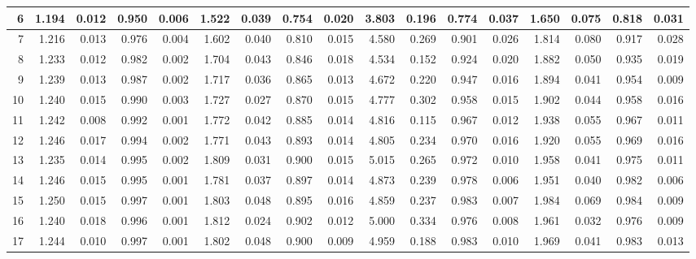 \documentclass[
]{article}
\begin{document}
\begin{table}[H]
{\begin{tabular}[t]{r|r|r|r|r|r|r|r|r|r|r|r|r|r|r|r|r}
\hline
\hspace{1em}6 & 1.194 & 0.012 & 0.950 & 0.006 & 1.522 & 0.039 & 0.754 & 0.020 & 3.803 & 0.196 & 0.774 & 0.037 & 1.650 & 0.075 & 0.818 & 0.031\\
\hline
\hspace{1em}7 & 1.216 & 0.013 & 0.976 & 0.004 & 1.602 & 0.040 & 0.810 & 0.015 & 4.580 & 0.269 & 0.901 & 0.026 & 1.814 & 0.080 & 0.917 & 0.028\\
\hline
\hspace{1em}8 & 1.233 & 0.012 & 0.982 & 0.002 & 1.704 & 0.043 & 0.846 & 0.018 & 4.534 & 0.152 & 0.924 & 0.020 & 1.882 & 0.050 & 0.935 & 0.019\\
\hline
\hspace{1em}9 & 1.239 & 0.013 & 0.987 & 0.002 & 1.717 & 0.036 & 0.865 & 0.013 & 4.672 & 0.220 & 0.947 & 0.016 & 1.894 & 0.041 & 0.954 & 0.009\\
\hline
\hspace{1em}10 & 1.240 & 0.015 & 0.990 & 0.003 & 1.727 & 0.027 & 0.870 & 0.015 & 4.777 & 0.302 & 0.958 & 0.015 & 1.902 & 0.044 & 0.958 & 0.016\\
\hline
\hspace{1em}11 & 1.242 & 0.008 & 0.992 & 0.001 & 1.772 & 0.042 & 0.885 & 0.014 & 4.816 & 0.115 & 0.967 & 0.012 & 1.938 & 0.055 & 0.967 & 0.011\\
\hline
\hspace{1em}12 & 1.246 & 0.017 & 0.994 & 0.002 & 1.771 & 0.043 & 0.893 & 0.014 & 4.805 & 0.234 & 0.970 & 0.016 & 1.920 & 0.055 & 0.969 & 0.016\\
\hline
\hspace{1em}13 & 1.235 & 0.014 & 0.995 & 0.002 & 1.809 & 0.031 & 0.900 & 0.015 & 5.015 & 0.265 & 0.972 & 0.010 & 1.958 & 0.041 & 0.975 & 0.011\\
\hline
\hspace{1em}14 & 1.246 & 0.015 & 0.995 & 0.001 & 1.781 & 0.037 & 0.897 & 0.014 & 4.873 & 0.239 & 0.978 & 0.006 & 1.951 & 0.040 & 0.982 & 0.006\\
\hline
\hspace{1em}15 & 1.250 & 0.015 & 0.997 & 0.001 & 1.803 & 0.048 & 0.895 & 0.016 & 4.859 & 0.237 & 0.983 & 0.007 & 1.984 & 0.069 & 0.984 & 0.009\\
\hline
\hspace{1em}16 & 1.240 & 0.018 & 0.996 & 0.001 & 1.812 & 0.024 & 0.902 & 0.012 & 5.000 & 0.334 & 0.976 & 0.008 & 1.961 & 0.032 & 0.976 & 0.009\\
\hline
\hspace{1em}17 & 1.244 & 0.010 & 0.997 & 0.001 & 1.802 & 0.048 & 0.900 & 0.009 & 4.959 & 0.188 & 0.983 & 0.010 & 1.969 & 0.041 & 0.983 & 0.013\\

\end{tabular}}
\end{table}
\end{document}
